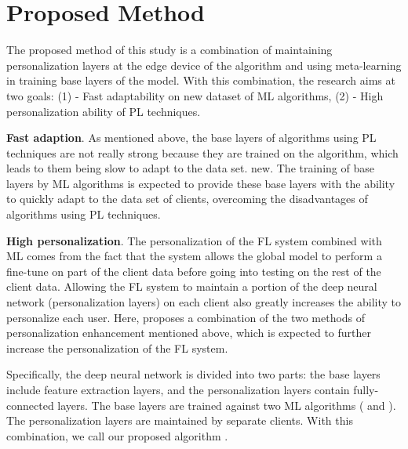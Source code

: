 \documentclass[runningheads]{llncs}
\begin{document}
\section{Proposed Method}

The proposed method of this study is a combination of maintaining personalization layers at the edge device of the algorithm  and using meta-learning in training base layers of the model. With this combination, the research aims at two goals: (1) - Fast adaptability on new dataset of ML algorithms, (2) - High personalization ability of PL techniques.

\textbf{Fast adaption}. As mentioned above, the base layers of algorithms using PL techniques are not really strong because they are trained on the  algorithm, which leads to them being slow to adapt to the data set. new. The training of base layers by ML algorithms is expected to provide these base layers with the ability to quickly adapt to the data set of clients, overcoming the disadvantages of algorithms using PL techniques.

\textbf{High personalization}. The personalization of the FL system combined with ML comes from the fact that the system allows the global model to perform a fine-tune on part of the client data before going into testing on the rest of the client data. Allowing the FL system to maintain a portion of the deep neural network (personalization layers) on each client also greatly increases the ability to personalize each user. Here,  proposes a combination of the two methods of personalization enhancement mentioned above, which is expected to further increase the personalization of the FL system.

Specifically, the deep neural network is divided into two parts: the base layers include feature extraction layers, and the personalization layers contain fully-connected layers. The base layers are trained against two ML algorithms ( and ). The personalization layers are maintained by separate clients. With this combination, we call our proposed algorithm .
\end{document}
